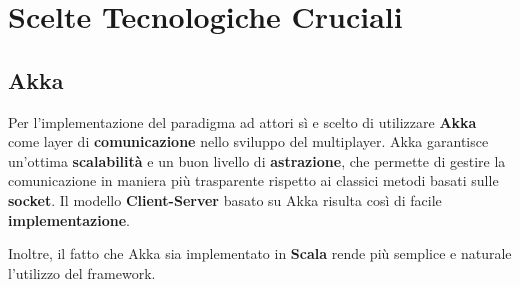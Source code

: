 \section{Scelte Tecnologiche Cruciali}
    \subsection{Akka} 
        Per l'implementazione del paradigma ad attori sì e scelto di utilizzare \textbf{Akka} come layer di \textbf{comunicazione} nello sviluppo del multiplayer. Akka garantisce un'ottima \textbf{scalabilità} e un buon livello di \textbf{astrazione}, che permette di gestire la comunicazione in maniera più trasparente rispetto ai classici metodi basati sulle \textbf{socket}. Il modello \textbf{Client-Server} basato su Akka risulta così di facile \textbf{implementazione}.
        
        Inoltre, il fatto che Akka sia implementato in \textbf{Scala} rende più semplice e naturale l'utilizzo del framework. 